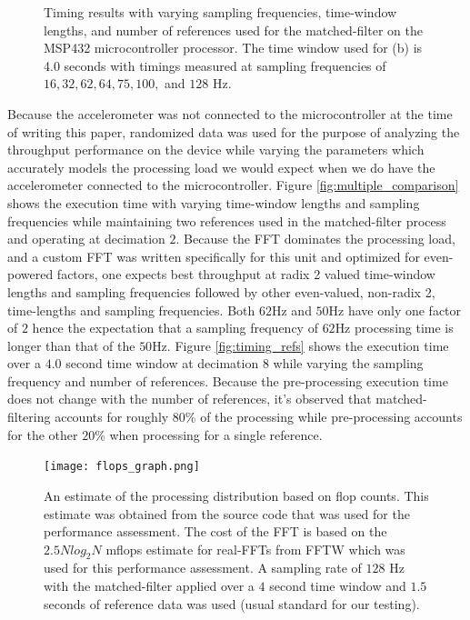 \documentclass[conference]{IEEEtran}
\begin{document}
\begin{figure}[!ht]
   \centering
   \quad
   \caption{Timing results with varying sampling frequencies, time-window lengths, and number of references used for the matched-filter on the MSP432 microcontroller processor. The time window used for (b) is 4.0 seconds with timings measured at sampling frequencies of $16, 32, 62, 64, 75, 100,$ and $128$ Hz.}
   \label{fig:timing}
\end{figure}
%
Because the accelerometer was not connected to the microcontroller at the time of writing this paper, randomized data was used for the purpose of analyzing the throughput performance on the device while varying the parameters which accurately models the processing load we would expect when we do have the accelerometer connected to the microcontroller.
Figure \ref{fig:multiple_comparison} shows the execution time with varying time-window lengths and sampling frequencies while maintaining two references used in the matched-filter process and operating at decimation $2$.
Because the FFT dominates the processing load, and a custom FFT was written specifically for this unit and optimized for even-powered factors, one expects best throughput at radix 2 valued time-window lengths and sampling frequencies followed by other even-valued, non-radix 2, time-lengths and sampling frequencies. Both $62$Hz and $50$Hz have only one factor of $2$ hence the expectation that a sampling frequency of $62$Hz processing time is longer than that of the $50$Hz.
Figure \ref{fig:timing_refs} shows the execution time over a $4.0$ second time window at decimation $8$ while varying the sampling frequency and number of references. Because the pre-processing execution time does not change with the number of references, it's observed that matched-filtering accounts for roughly $80$\% of the processing while pre-processing accounts for the other $20$\% when processing for a single reference.
%
\begin{figure}[!ht]
   \centering
   \texttt{[image: flops\_graph.png]}
   \caption{An estimate of the processing distribution based on flop counts. This estimate was obtained from the source code that was used for the performance assessment. The cost of the FFT is based on the $2.5 N log_2 N$ mflops estimate for real-FFTs from FFTW \cite{FFTW} which was used for this performance assessment. A sampling rate of $128$ Hz with the matched-filter applied over a $4$ second time window and $1.5$ seconds of reference data was used (usual standard for our testing).}
   \label{fig:flops_count}
\end{figure}
\end{document}
